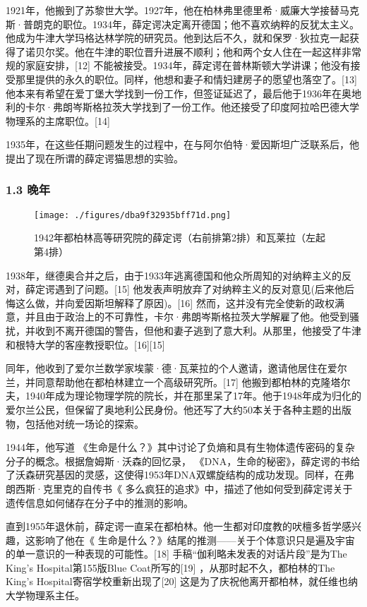 1921年，他搬到了苏黎世大学。1927年，他在柏林弗里德里希·威廉大学接替马克斯·普朗克的职位。1934年，薛定谔决定离开德国；他不喜欢纳粹的反犹太主义。他成为牛津大学玛格达林学院的研究员。他到达后不久，就和保罗·狄拉克一起获得了诺贝尔奖。他在牛津的职位晋升进展不顺利；他和两个女人住在一起这样非常规的家庭安排，[12] 不能被接受。1934年，薛定谔在普林斯顿大学讲课；他没有接受那里提供的永久的职位。同样，他想和妻子和情妇建房子的愿望也落空了。[13] 他本来有希望在爱丁堡大学找到一份工作，但签证延迟了，最后他于1936年在奥地利的卡尔·弗朗岑斯格拉茨大学找到了一份工作。他还接受了印度阿拉哈巴德大学物理系的主席职位。[14]

1935年，在这些任期问题发生的过程中，在与阿尔伯特·爱因斯坦广泛联系后，他提出了现在所谓的薛定谔猫思想的实验。

\subsubsection{1.3 晚年}
\begin{figure}[ht]
\centering
\texttt{[image: ./figures/dba9f32935bff71d.png]}
\caption{1942年都柏林高等研究院的薛定谔（右前排第2排）和瓦莱拉（左起第4排）} \label{fig_Erwin_2}
\end{figure}
1938年，继德奥合并之后，由于1933年逃离德国和他众所周知的对纳粹主义的反对，薛定谔遇到了问题。[15] 他发表声明放弃了对纳粹主义的反对意见(后来他后悔这么做，并向爱因斯坦解释了原因)。[16] 然而，这并没有完全使新的政权满意，并且由于政治上的不可靠性，卡尔·弗朗岑斯格拉茨大学解雇了他。他受到骚扰，并收到不离开德国的警告，但他和妻子逃到了意大利。从那里，他接受了牛津和根特大学的客座教授职位。[16][15]

同年，他收到了爱尔兰数学家埃蒙·德·瓦莱拉的个人邀请，邀请他居住在爱尔兰，并同意帮助他在都柏林建立一个高级研究所。[17] 他搬到都柏林的克隆塔尔夫，1940年成为理论物理学院的院长，并在那里呆了17年。他于1948年成为归化的爱尔兰公民，但保留了奥地利公民身份。他还写了大约50本关于各种主题的出版物，包括他对统一场论的探索。

1944年，他写道 《生命是什么？》其中讨论了负熵和具有生物体遗传密码的复杂分子的概念。根据詹姆斯·沃森的回忆录， 《DNA，生命的秘密》，薛定谔的书给了沃森研究基因的灵感，这使得1953年DNA双螺旋结构的成功发现。同样，在弗朗西斯·克里克的自传书《 多么疯狂的追求》中，描述了他如何受到薛定谔关于遗传信息如何储存在分子中的推测的影响。

直到1955年退休前，薛定谔一直呆在都柏林。他一生都对印度教的吠檀多哲学感兴趣，这影响了他在《 生命是什么？》结尾的推测——关于个体意识只是遍及宇宙的单一意识的一种表现的可能性。[18] 手稿“伽利略未发表的对话片段”是为The King's Hospital第155版Blue Coat所写的[19] ，从那时起不久，都柏林的The King's Hospital寄宿学校重新出现了[20] 这是为了庆祝他离开都柏林，就任维也纳大学物理系主任。

